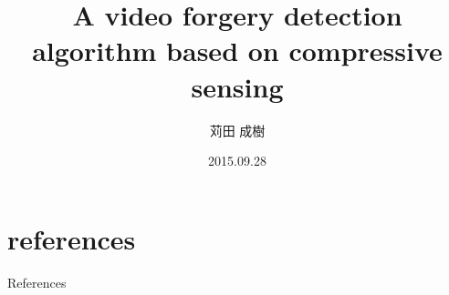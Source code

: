 \documentclass[dvipdfmx,11pt,notheorems]{beamer}
\title[A video forgery detection algorithm based on compressive sensing]{A video forgery detection algorithm based on compressive sensing}
\author[苅田 成樹]{苅田 成樹}
\institute[JPN]{M2}
\date{2015.09.28}
\begin{document}








\section*{references}
\begin{frame}[allowframebreaks]{References}
    \scriptsize
    
    
\end{frame}
\end{document}
